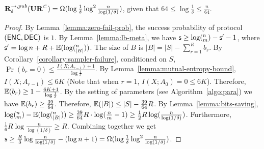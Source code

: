 \begin{theorem}
  $\mathbf{R}^{\rightarrow,pub}_\delta(\mathbf{UR}^\subset) = \Omega(\log \frac{1}{\delta}\log^2 \frac{n}{\log (1/\delta)} )$, given that $64 \le \log \frac{1}{\delta} \le \frac{n}{64}$.
\end{theorem}

\begin{proof}
  By Lemma~\ref{lemma:zero-fail-prob}, the success probability of protocol $(\textsf{ENC},\textsf{DEC})$ is $1$. 
  By Lemma~\ref{lemma:lb-meta}, we have $\textsf{s}\ge \log (^n_m) - \textsf{s}' -1$, where $\textsf{s}'=\log n + R+ \operatorname*{\mathbb{E}}(\log (^n_{|B|}))$. 
  The size of $B$ is $|B|=|S|-\sum_{r=1}^{R}{b_r}$.
  By Corollary~\ref{corollary:sampler-failure}, conditioned on $S$, $\Pr(b_r=0)\le \frac{I(X;A_{r-1})+1}{\log\frac{1}{\delta}}$. 
  By Lemma~\ref{lemma:mutual-entropy-bound}, $I(X;A_{r-1})\le 6K$ (Note that when $r=1$, $I(X;A_0)=0\le 6K$). 
  Therefore, $\operatorname*{\mathbb{E}}(b_r)\ge 1-\frac{6K+1}{\log\frac{1}{\delta}}$.
  By the setting of parameters (see Algorithm~\ref{algo:para}) we have $\operatorname*{\mathbb{E}}(b_r)\ge \frac{39}{64}$. Therefore, $\operatorname*{\mathbb{E}}(|B|)\le |S|-\frac{39}{64}R$. 
  By Lemma~\ref{lemma:bits-saving}, $\log (^n_m)-\operatorname*{\mathbb{E}}(\log (^n_{|B|}))\ge \frac{39}{64}R\cdot \log (\frac{n}{m}-1) \ge \frac{1}{2}R\log (\frac{n}{\log(1/\delta)})$. 
  Furthermore, $\frac{1}{6}R\log \frac{n}{\log (1/\delta)} \ge R$.
  Combining together we get $\textsf{s} \ge \frac{R}{3}\log \frac{n}{\log(1/\delta)} -(\log n + 1)  =\Omega(\log \frac{1}{\delta}\log^2 \frac{n}{\log (1/\delta)} )$.
\end{proof}